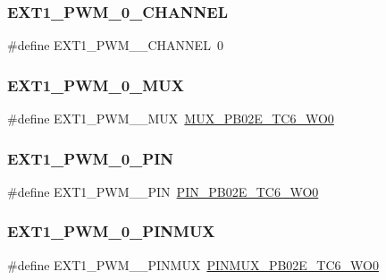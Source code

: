\subsubsection{\texorpdfstring{EXT1\_PWM\_0\_CHANNEL}{EXT1\_PWM\_0\_CHANNEL}}
{\footnotesize\ttfamily \#define E\+X\+T1\+\_\+\+P\+W\+M\+\_\+\_\+\+C\+H\+A\+N\+N\+EL~0}

\mbox{\label{group__samd21__xplained__pro__features__group_gac923210c50489df59fac85fcfc6d945f}} 
\subsubsection{\texorpdfstring{EXT1\_PWM\_0\_MUX}{EXT1\_PWM\_0\_MUX}}
{\footnotesize\ttfamily \#define E\+X\+T1\+\_\+\+P\+W\+M\+\_\+\_\+\+M\+UX~\mbox{\hyperlink{pio_2samd21j18a_8h_a335485d7f34d2e34ce5c00dc9bfb38eb}{M\+U\+X\+\_\+\+P\+B02\+E\+\_\+\+T\+C6\+\_\+\+W\+O0}}}

\mbox{\label{group__samd21__xplained__pro__features__group_ga9aa2d5165f8d3906e4910d119ef59980}} 
\subsubsection{\texorpdfstring{EXT1\_PWM\_0\_PIN}{EXT1\_PWM\_0\_PIN}}
{\footnotesize\ttfamily \#define E\+X\+T1\+\_\+\+P\+W\+M\+\_\+\_\+\+P\+IN~\mbox{\hyperlink{pio_2samd21j18a_8h_a89450ffd1e32e588e58d3a4c2f97d7b4}{P\+I\+N\+\_\+\+P\+B02\+E\+\_\+\+T\+C6\+\_\+\+W\+O0}}}

\mbox{\label{group__samd21__xplained__pro__features__group_ga01ad2224572edd5f5b0dafe90483d462}} 
\subsubsection{\texorpdfstring{EXT1\_PWM\_0\_PINMUX}{EXT1\_PWM\_0\_PINMUX}}
{\footnotesize\ttfamily \#define E\+X\+T1\+\_\+\+P\+W\+M\+\_\+\_\+\+P\+I\+N\+M\+UX~\mbox{\hyperlink{pio_2samd21j18a_8h_a51cfc2e2d80835238970f5d896a35dda}{P\+I\+N\+M\+U\+X\+\_\+\+P\+B02\+E\+\_\+\+T\+C6\+\_\+\+W\+O0}}}

